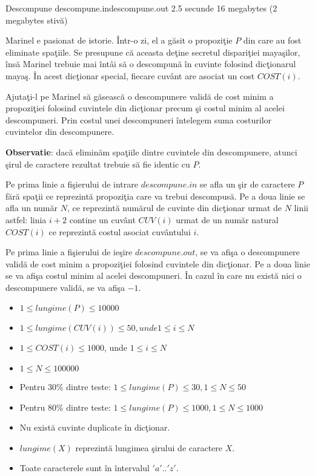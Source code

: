 \begin{problem}{Descompune}
{descompune.in}{descompune.out}
{2.5 secunde} {16 megabytes (2 megabytes stiv\u{a})}{}

Marinel e pasionat de istorie. \^{I}ntr-o zi, el a g\u{a}sit o propozi\c{t}ie $P$ din care au fost eliminate spa\c{t}iile. Se presupune c\u{a} aceasta de\c{t}ine secretul dispari\c{t}iei maya\c{s}ilor, \^{i}ns\u{a} Marinel trebuie mai \^{i}nt\^{a}i s\u{a} o descompun\u{a} \^{i}n cuvinte folosind dic\c{t}ionarul maya\c{s}. \^{I}n acest dic\c{t}ionar special, fiecare cuv\^{a}nt are asociat un cost $COST(i)$.

Ajuta\c{t}i-l pe Marinel s\u{a} g\u{a}seasc\u{a} o descompunere valid\u{a} de cost minim a propozi\c{t}iei folosind cuvintele din dic\c{t}ionar precum \c{s}i costul minim al acelei descompuneri. Prin costul unei descompuneri \^{i}ntelegem suma costurilor cuvintelor din descompunere.

\textbf{Observatie}: dac\u{a} elimin\u{a}m spa\c{t}iile dintre cuvintele din descompunere, atunci \c{s}irul de caractere rezultat trebuie s\u{a} fie identic cu $P$.


\InputFile

Pe prima linie a fi\c{s}ierului de intrare $descompune.in$ se afla un \c{s}ir de caractere $P$ f\u{a}r\u{a} spa\c{t}ii ce reprezint\u{a} propozi\c{t}ia care va trebui descompus\u{a}. Pe a doua linie se afla un num\u{a}r $N$, ce reprezint\u{a} num\u{a}rul de cuvinte din dic\c{t}ionar urmat de $N$ linii astfel: linia $i + 2$ contine un cuv\^{a}nt $CUV(i)$ urmat de un num\u{a}r natural $COST(i)$ ce reprezint\u{a} costul asociat cuv\^{a}ntului $i$.

\OutputFile

Pe prima linie a fi\c{s}ierului de ie\c{s}ire $descompune.out$, se va afi\c{s}a o descompunere valid\u{a} de cost minim a propozi\c{t}iei folosind cuvintele din dic\c{t}ionar.
Pe a doua linie se va afi\c{s}a costul minim al acelei descompuneri.
\^{I}n cazul \^{i}n care nu exist\u{a} nici o descompunere valid\u{a}, se va afi\c{s}a $-1$.

\Constraints
\begin{itemize}
	\setlength{\itemsep}{1pt}
  	\setlength{\parskip}{0pt}
  	\setlength{\parsep}{0pt}
 	\item $1 \le lungime(P) \le 10 000$
	\item $1 \le lungime(CUV(i)) \le 50, unde 1 \le i \le N$
	\item $1 \le COST(i) \le 1000$, unde $1 \le i \le N$
	\item $1 \le N \le 100 000$
	\item Pentru $30 \%$ dintre teste: $1 \le lungime(P) \le 30, 1 \le N \le 50$
	\item Pentru $80 \%$ dintre teste: $1 \le lungime(P) \le 1000, 1 \le N \le 1000$
	\item Nu exist\u{a} cuvinte duplicate \^{i}n dic\c{t}ionar.
	\item $lungime(X)$ reprezint\u{a} lungimea \c{s}irului de caractere $X$.
	\item Toate caracterele sunt \^{i}n \^{i}ntervalul $'a'..'z'$.
\end{itemize}



\end{problem}
